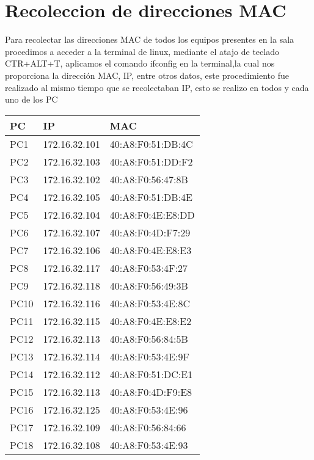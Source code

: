 \documentclass[spanish]{udpreport}
\begin{document}
\section{Recoleccion de direcciones MAC}
Para recolectar las direcciones MAC de todos los equipos presentes en la sala procedimos a acceder a la terminal de linux, mediante el atajo de teclado CTR+ALT+T, aplicamos el comando ifconfig en la terminal,la cual nos proporciona la dirección MAC, IP, entre otros datos, este procedimiento fue realizado al mismo tiempo que se recolectaban IP, esto se realizo en todos y cada uno de los PC
\vspace{2cm}
\begin{table}[H]
\begin{center}
\begin{tabular}{|l|l|l|}
\hline
PC & IP & MAC \\
\hline \hline
PC1 & 172.16.32.101  & 40:A8:F0:51:DB:4C \\ \hline
PC2 & 172.16.32.103  & 40:A8:F0:51:DD:F2 \\ \hline
PC3 & 172.16.32.102  & 40:A8:F0:56:47:8B \\ \hline
PC4 & 172.16.32.105  & 40:A8:F0:51:DB:4E \\ \hline
PC5 & 172.16.32.104  & 40:A8:F0:4E:E8:DD \\ \hline
PC6 & 172.16.32.107  & 40:A8:F0:4D:F7:29 \\ \hline
PC7 & 172.16.32.106  & 40:A8:F0:4E:E8:E3 \\ \hline
PC8 & 172.16.32.117  & 40:A8:F0:53:4F:27 \\ \hline
PC9 & 172.16.32.118  & 40:A8:F0:56:49:3B \\ \hline
PC10 & 172.16.32.116 & 40:A8:F0:53:4E:8C \\ \hline
PC11 & 172.16.32.115 & 40:A8:F0:4E:E8:E2 \\ \hline
PC12 & 172.16.32.113 & 40:A8:F0:56:84:5B \\ \hline
PC13 & 172.16.32.114 & 40:A8:F0:53:4E:9F \\ \hline
PC14 & 172.16.32.112 & 40:A8:F0:51:DC:E1 \\ \hline
PC15 & 172.16.32.113 & 40:A8:F0:4D:F9:E8 \\ \hline
PC16 & 172.16.32.125 & 40:A8:F0:53:4E:96 \\ \hline
PC17 & 172.16.32.109 & 40:A8:F0:56:84:66 \\ \hline
PC18 & 172.16.32.108 & 40:A8:F0:53:4E:93 \\ \hline
\end{tabular}
\label{tabla:sencilla}
\end{center}
\end{table}
\vspace{16cm}
\end{document}
